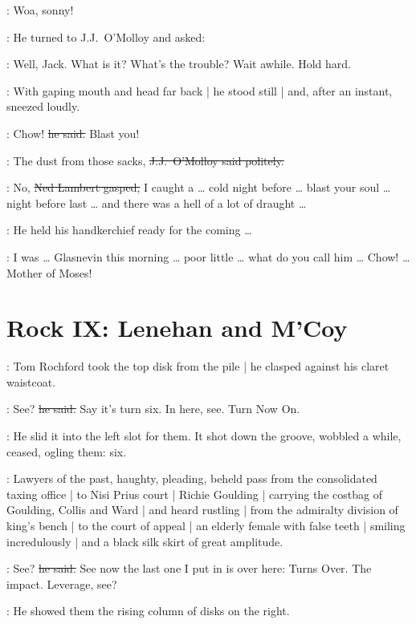\lambert:
Woa, sonny!

:
He turned to J.J.~O'Molloy and asked:

\lambert:
Well, Jack.
What is it?
What's the trouble?
Wait awhile.
Hold hard.

:
With gaping mouth and head far back |
he stood still |
and, after an instant,
sneezed loudly.

\lambert:
Chow!
\sout{he said.}
Blast you!

\jjom:
The dust from those sacks,
\sout{J.J.~O'Molloy said politely.}

\lambert:
No,
\sout{Ned Lambert gasped,}
I caught a \ldots
cold night before \ldots
blast your soul \ldots%
night before last \ldots
and there was a hell of a lot of draught \ldots

:
He held his handkerchief ready for the coming \ldots

\lambert:
I was \ldots
Glasnevin this morning \ldots
poor little \ldots
what do you call him \ldots
Chow! \ldots
Mother of Moses!


\section*{Rock IX: Lenehan and M'Coy}


:
Tom Rochford took the top disk from the pile |
he clasped against his claret waistcoat.

\rochford:
See?
\sout{he said.}
Say it's turn six.
In here, see.
Turn Now On.

:
He slid it into the left slot for them.
It shot down the groove,
wobbled a while,
ceased,
ogling them:
six.

\begin{interject}
    :
    Lawyers of the past, haughty, pleading,
    beheld pass from the consolidated taxing office |
    to Nisi Prius court |
    Richie Goulding |
    carrying the costbag of Goulding, Collis and Ward |
    and heard rustling |
    from the admiralty division of king's bench |
    to the court of appeal |
    an elderly female with false teeth |
    smiling incredulously |
    and a black silk skirt of great amplitude.
\end{interject}

\rochford:
See?
\sout{he said.}
See now the last one I put in is over here:
Turns Over.
The impact. Leverage, see?

:
He showed them the rising column of disks on the right.

